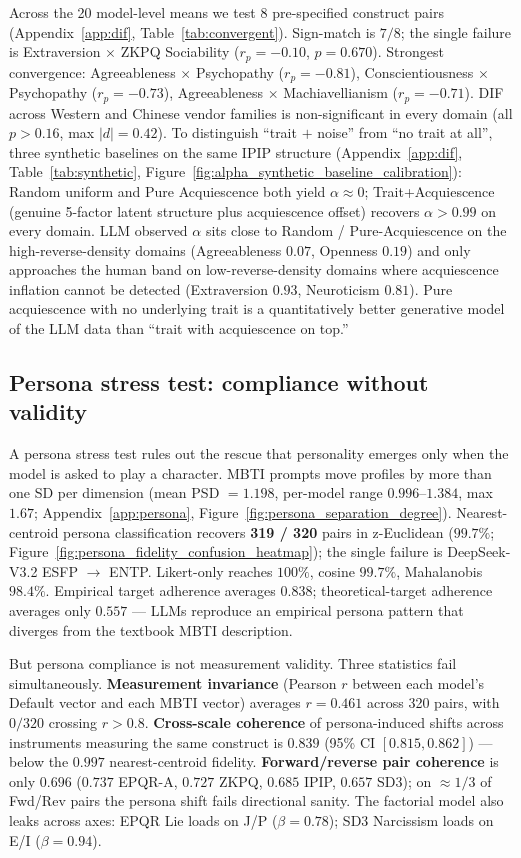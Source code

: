 \documentclass[11pt]{article}
\begin{document}
Across the 20 model-level means we test 8 pre-specified construct pairs (Appendix~\ref{app:dif}, Table~\ref{tab:convergent}). Sign-match is $7/8$; the single failure is Extraversion $\times$ ZKPQ Sociability ($r_p = -0.10$, $p = 0.670$). Strongest convergence: Agreeableness $\times$ Psychopathy ($r_p = -0.81$), Conscientiousness $\times$ Psychopathy ($r_p = -0.73$), Agreeableness $\times$ Machiavellianism ($r_p = -0.71$). DIF across Western and Chinese vendor families is non-significant in every domain (all $p > 0.16$, max $|d| = 0.42$). To distinguish ``trait $+$ noise'' from ``no trait at all'', three synthetic baselines on the same IPIP structure (Appendix~\ref{app:dif}, Table~\ref{tab:synthetic}, Figure~\ref{fig:alpha_synthetic_baseline_calibration}): Random uniform and Pure Acquiescence both yield $\alpha \approx 0$; Trait+Acquiescence (genuine 5-factor latent structure plus acquiescence offset) recovers $\alpha > 0.99$ on every domain. LLM observed $\alpha$ sits close to Random / Pure-Acquiescence on the high-reverse-density domains (Agreeableness $0.07$, Openness $0.19$) and only approaches the human band on low-reverse-density domains where acquiescence inflation cannot be detected (Extraversion $0.93$, Neuroticism $0.81$). Pure acquiescence with no underlying trait is a quantitatively better generative model of the LLM data than ``trait with acquiescence on top.''

\subsection{Persona stress test: compliance without validity}
\label{sec:results-persona}

A persona stress test rules out the rescue that personality emerges only when the model is asked to play a character. MBTI prompts move profiles by more than one SD per dimension (mean PSD $= 1.198$, per-model range $0.996$--$1.384$, max $1.67$; Appendix~\ref{app:persona}, Figure~\ref{fig:persona_separation_degree}). Nearest-centroid persona classification recovers \textbf{319 / 320} pairs in z-Euclidean ($99.7\%$; Figure~\ref{fig:persona_fidelity_confusion_heatmap}); the single failure is DeepSeek-V3.2 ESFP $\to$ ENTP. Likert-only reaches $100\%$, cosine $99.7\%$, Mahalanobis $98.4\%$. Empirical target adherence averages $0.838$; theoretical-target adherence averages only $0.557$ --- LLMs reproduce an empirical persona pattern that diverges from the textbook MBTI description.

But persona compliance is not measurement validity. Three statistics fail simultaneously. \textbf{Measurement invariance} (Pearson $r$ between each model's Default vector and each MBTI vector) averages $r = 0.461$ across 320 pairs, with $0/320$ crossing $r > 0.8$. \textbf{Cross-scale coherence} of persona-induced shifts across instruments measuring the same construct is $0.839$ (95\% CI $[0.815, 0.862]$) --- below the $0.997$ nearest-centroid fidelity. \textbf{Forward/reverse pair coherence} is only $0.696$ ($0.737$ EPQR-A, $0.727$ ZKPQ, $0.685$ IPIP, $0.657$ SD3); on ${\approx}1/3$ of Fwd/Rev pairs the persona shift fails directional sanity. The factorial model also leaks across axes: EPQR Lie loads on J/P ($\beta = 0.78$); SD3 Narcissism loads on E/I ($\beta = 0.94$).
\end{document}
